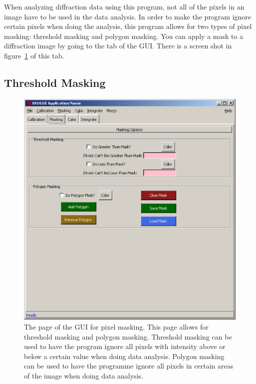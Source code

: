 
When analyzing diffraction data using this program,
not all of the pixels in an image have to be used in
the data analysis. In order to make the program
ignore certain pixels when doing the analysis, this
program allows for two types of pixel masking:
threshold masking and polygon masking. You can apply
a mask to a diffraction image by going to the
 tab of the GUI. There is a screen
shot in figure~\ref{masking_page} of this tab.


\subsection{Threshold Masking}

\begin{figure}
\centering
\includegraphics[scale=.75]{figures/masking_page.eps}
\caption{The page of the GUI for pixel masking. This 
page allows for threshold masking and polygon masking. 
Threshold masking can be used to have the program 
ignore all pixels with intensity above or below
a certain value when doing data analysis. 
Polygon masking can be used to have the programme
ignore all pixels in certain areas of the image
when doing data analysis.} 
\label{masking_page}
\end{figure}


